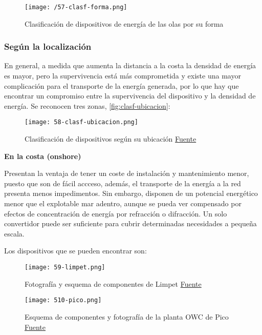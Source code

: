 \begin{figure}[htb]
\centering
\texttt{[image: /57-clasf-forma.png]}
\caption{Clasificación de dispositivos de energía de las olas por su forma}
\label{fig:clasf-forma}
\end{figure}

\subsubsection{Según la localización}\label{header-n123}

En general, a medida que aumenta la distancia a la costa la densidad de
energía es mayor, pero la supervivencia está más comprometida y existe
una mayor complicación para el transporte de la energía generada, por lo
que hay que encontrar un compromiso entre la supervivencia del
dispositivo y la densidad de energía. Se reconocen tres zonas, \autoref{fig:clasf-ubicacion}:

\begin{figure}[hb]
\centering
\texttt{[image: 58-clasf-ubicacion.png]}
\caption[Clasificación de dispositivos según su ubicación]{Clasificación de dispositivos según su ubicación \href{https://revista-anales.icai.es/web/n_14/seccion_8.html}{Fuente}}
\label{fig:clasf-ubicacion}
\end{figure}

\textbf{En la costa (onshore)}

Presentan la ventaja de tener un coste de instalación y mantenimiento
menor, puesto que son de fácil accceso, además, el transporte de la
energía a la red presenta menos impedimentos. Sin embargo, disponen de
un potencial energético menor que el explotable mar adentro, aunque se
pueda ver compensado por efectos de concentración de energía por
refracción o difracción. Un solo convertidor puede ser suficiente para
cubrir determinadas necesidades a pequeña escala.

Los dispositivos que se pueden encontrar son:

\begin{figure}
\centering
\texttt{[image: 59-limpet.png]}
\caption[Fotografía y esquema de componentes de Limpet]{Fotografía y esquema de componentes de Limpet \href{www.wavegen.co.uk}{Fuente}}
\label{fig:limpet}
\end{figure}

\begin{figure}
\centering
\texttt{[image: 510-pico.png]}
\caption[Esquema de componentes y fotografía de la planta OWC de Pico]{Esquema de componentes y fotografía de la planta OWC de Pico \href{www.pico-owc.net}{Fuente}}
\label{fig:pico}
\end{figure}

